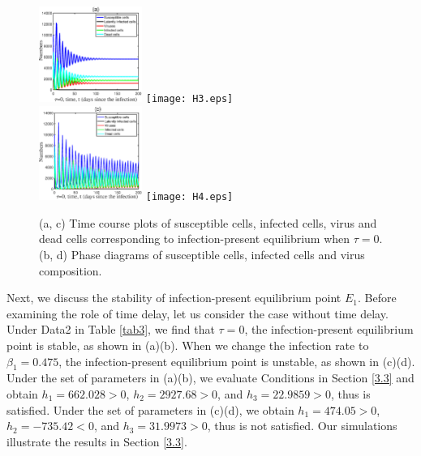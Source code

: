 \documentclass{CMHPhD-SIVD}
\begin{document}
\begin{figure}[h!]
\centering
\includegraphics[height=0.16\textheight,width=0.3\textwidth]{H1.eps}
\texttt{[image: H3.eps]}\\
\includegraphics[height=0.16\textheight,width=0.3\textwidth]{H2.eps}
\texttt{[image: H4.eps]}
\vspace{3mm}
\caption{(a, c) Time course plots of susceptible cells, infected cells, virus and dead cells corresponding to infection-present equilibrium when $\tau=0$. (b, d) Phase diagrams of susceptible cells, infected cells and virus composition.}
\label{Fig.2}
\end{figure}

Next, we discuss the stability of infection-present equilibrium point $E_1$.
Before examining the role of time delay, let us consider the case without time delay. Under Data2 in Table \ref{tab3}, we find that $\tau=0$, the infection-present equilibrium point is stable, as shown in (a)(b). When we change the infection rate to $\beta_1=0.475$, the infection-present equilibrium point is unstable, as shown in (c)(d). Under the set of parameters in (a)(b), we evaluate Conditions  in Section \ref{3.3} and obtain $h_1=662.028>0$, $h_2=2927.68>0$, and $h_3=22.9859>0$, thus  is satisfied. Under the set of parameters in (c)(d),  we obtain $h_1=474.05>0$, $h_2=-735.42<0$, and $h_3=31.9973>0$, thus  is not satisfied. Our simulations illustrate the results in Section \ref{3.3}.
\end{document}
